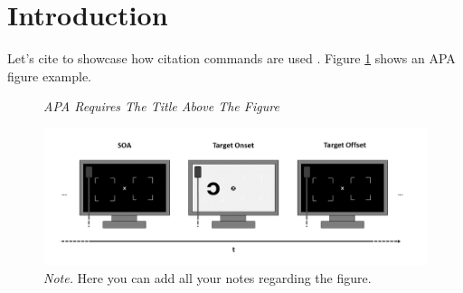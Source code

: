 \section{Introduction}

Let's cite \textcite{Michel2021} to showcase how citation commands are used \parencite[also works in parentheses][]{Michel2021}. Figure \ref{fig:fig1} shows an APA figure example.


\begin{figure}[!ht]
    \centering
    \caption{}
    \label{fig:fig1}
    \caption*{\textit{APA Requires The Title Above The Figure}}
    \vspace*{8mm}
    \includegraphics[width=1\textwidth]{../figures/Fig1}
    \caption*{\textit{Note.} Here you can add all your notes regarding the figure.}
\end{figure}
